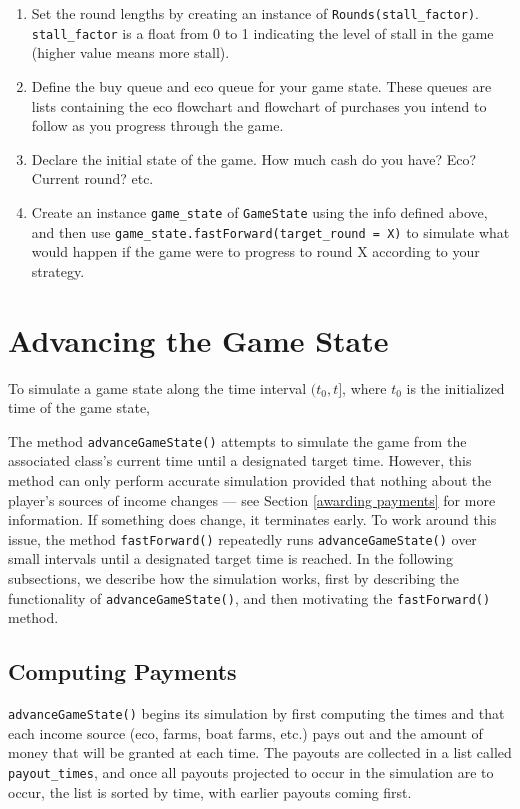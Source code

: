 \documentclass[12pt,letterpaper]{article}
\theoremstyle{remark}
\theoremstyle{plain}
\begin{document}
\begin{enumerate}
    \item Set the round lengths by creating an instance of \texttt{Rounds(stall\_factor)}. \texttt{stall\_factor} is a float from 0 to 1 indicating the level of stall in the game (higher value means more stall).
    \item Define the buy queue and eco queue for your game state. These queues are lists containing the eco flowchart and flowchart of purchases you intend to follow as you progress through the game.
    \item Declare the initial state of the game. How much cash do you have? Eco? Current round? etc.
    \item Create an instance \texttt{game\_state} of \texttt{GameState} using the info defined above, and then use \texttt{game\_state.fastForward(target\_round = X)} to simulate what would happen if the game were to progress to round X according to your strategy.
\end{enumerate}

\section{Advancing the Game State}

To simulate a game state along the time interval $(t_0,t]$, where $t_0$ is the initialized time of the game state, 

The method \texttt{advanceGameState()} attempts to simulate the game from the associated class's current time until a designated target time. However, this method can only perform accurate simulation provided that nothing about the player's sources of income changes --- see Section \ref{awarding payments} for more information. If something does change, it terminates early. To work around this issue, the method \texttt{fastForward()} repeatedly runs \texttt{advanceGameState()} over small intervals until a designated target time is reached. In the following subsections, we describe how the simulation works, first by describing the functionality of \texttt{advanceGameState()}, and then motivating the \texttt{fastForward()} method.

\subsection{Computing Payments}

\texttt{advanceGameState()} begins its simulation by first computing the times and that each income source (eco, farms, boat farms, etc.) pays out and the amount of money that will be granted at each time. The payouts are collected in a list called \texttt{payout\_times}, and once all payouts projected to occur in the simulation are to occur, the list is sorted by time, with earlier payouts coming first.
\end{document}
